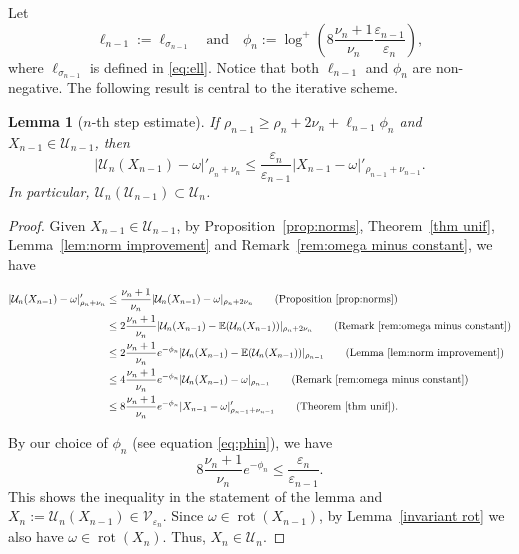 \documentclass[12pt,reqno,a4paper]{amsart}%
\numberwithin{equation}{section}
\newtheorem{lemma}[theorem]{Lemma}
\newcommand{\Vs}{{\mathscr{V}}}
\newcommand{\Us}{{\mathscr{U}}}
\newcommand{\UU}{{\mathcal U}}
\newcommand{\Ee}{{\mathbb{E}}}
\newcommand{\rot}{\operatorname{rot}}
\begin{document}
Let
\begin{equation}\label{eq:phin}
\ell_{n-1}:=\ell_{\sigma_{n-1}}\quad \text{and}\quad \phi_n:=\log^+\left(8\frac{\nu_n+1}{\nu_n}\frac{\varepsilon_{n-1}}{\varepsilon_n}\right),
\end{equation}
where $\ell_{\sigma_{n-1}}$ is defined in \eqref{eq:ell}. Notice that both $\ell_{n-1}$ and $\phi_n$ are non-negative. The following result is central to the iterative scheme.
\begin{lemma}[$n$-th step estimate]\label{lem:ren}
If
$\rho_{n-1}\geq \rho_n +2\nu_{n}+\ell_{n-1}\phi_n$ and $X_{n-1}\in \Us_{n-1}$, then
$$
|\UU_n(X_{n-1})-\omega|'_{\rho_n+\nu_n}\leq \frac{\varepsilon_n}{\varepsilon_{n-1}}|X_{n-1}-\omega|'_{\rho_{n-1}+\nu_{n-1}}.
$$
In particular, $\UU_n(\Us_{n-1})\subset \Us_{n}$.
\end{lemma}
\begin{proof}
Given $X_{n-1}\in \Us_{n-1}$, by Proposition~\ref{prop:norms}, Theorem~\ref{thm unif}, Lemma~\ref{lem:norm improvement} and Remark~\ref{rem:omega minus constant}, we have

\begin{align*}
|\UU_n(X_{n-1})-\omega|'_{\rho_n+\nu_n}&\leq\frac{\nu_n+1}{\nu_n} |\UU_n(X_{n-1})-\omega|_{\rho_n+2\nu_n}\tag*{(Proposition~\ref{prop:norms})}\\
&\leq 2\frac{\nu_n+1}{\nu_n}|\UU_{n}(X_{n-1})-\Ee(\UU_{n}(X_{n-1}))|_{\rho_n+2\nu_n}\tag*{(Remark~\ref{rem:omega minus constant})}\\
&\leq2\frac{\nu_n+1}{\nu_n}e^{-\phi_n}|\UU_{n}(X_{n-1})-\Ee(\UU_{n}(X_{n-1}))|_{\rho_{n-1}}\tag*{(Lemma~\ref{lem:norm improvement})}\\
&\leq 4\frac{\nu_n+1}{\nu_n}e^{-\phi_n}|\UU_{n}(X_{n-1})-\omega|_{\rho_{n-1}}\tag*{(Remark~\ref{rem:omega minus constant})}\\
&\leq 8\frac{\nu_n+1}{\nu_n}e^{-\phi_n}|X_{n-1}-\omega|'_{\rho_{n-1}+\nu_{n-1}}\tag*{(Theorem~\ref{thm unif})}.
\end{align*}

By our choice of $\phi_n$ (see equation \eqref{eq:phin}), we have
$$
8\frac{\nu_n+1}{\nu_n}e^{-\phi_n}\leq \frac{\varepsilon_{n}}{\varepsilon_{n-1}}. 
$$
This shows the inequality in the statement of the lemma and $X_n:=\UU_n(X_{n-1})\in \Vs_{\varepsilon_{n}}$. Since $\omega\in \rot(X_{n-1})$,  by Lemma~\ref{invariant rot} we also have $\omega\in \rot (X_n)$.  Thus,  $X_n\in \Us_n$.

\end{proof}
\end{document}
